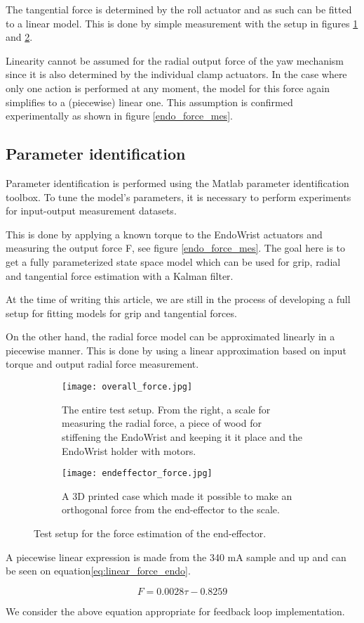 The tangential force is determined by the roll actuator and as such can be fitted to a linear model.
This is done by simple measurement with the setup in figures \ref{fig:entire_force_testsetup} and \ref{fig:endeffector_force}.

Linearity cannot be assumed for the radial output force of the yaw mechanism since it is also determined by the individual clamp actuators.
In the case where only one action is performed at any moment, the model for this force again simplifies to a (piecewise) linear one.
This assumption is confirmed experimentally as shown in figure \ref{endo_force_mes}.

\subsection{Parameter identification}
Parameter identification is performed using the Matlab parameter identification toolbox.
To tune the model’s parameters, it is necessary to perform experiments for input-output measurement datasets.

This is done by applying a known torque to the EndoWrist actuators and measuring the output force F, see figure \ref{endo_force_mes}.
The goal here is to get a fully parameterized state space model which can be used for grip, radial and tangential force estimation with a Kalman filter.




At the time of writing this article, we are still in the process of developing a full setup for fitting models for grip and tangential forces.

On the other hand, the radial force model can be approximated linearly in a piecewise manner.
This is done by using a linear approximation based on input torque and output radial force measurement.


\begin{figure}
  \centering
  \begin{subfigure}{.45\linewidth}
  \vspace{30pt}
    \centering
    \texttt{[image: overall\_force.jpg]}
    \caption{The entire test setup. From the right, a scale for measuring the radial force, a piece of wood for stiffening the EndoWrist and keeping it it place and the EndoWrist holder with motors.}
    \label{fig:entire_force_testsetup}
  \end{subfigure}
  \begin{subfigure}{.45\linewidth}
    \centering
    \texttt{[image: endeffector\_force.jpg]}
    \caption{A 3D printed case which made it possible to make an orthogonal force from the end-effector to the scale.}
    \label{fig:endeffector_force}
  \end{subfigure}
\caption{Test setup for the force estimation of the end-effector.}
\label{fig:Overview_force}
\end{figure}


A piecewise linear expression is made from the 340 mA sample and up and can be seen on equation\eqref{eq:linear_force_endo}.


\begin{equation}
F = 0.0028  \tau -0.8259
\label{eq:linear_force_endo}
\end{equation}


We consider the above equation appropriate for feedback loop implementation.
